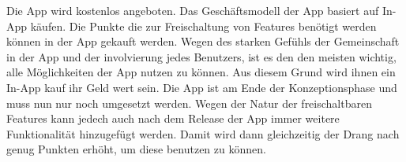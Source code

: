 Die App wird kostenlos angeboten. Das Geschäftsmodell der App basiert auf In-App käufen. Die Punkte die zur Freischaltung von Features benötigt werden können in der App gekauft werden. Wegen des starken Gefühls der Gemeinschaft in der App und der involvierung jedes Benutzers, ist es den den meisten wichtig, alle Möglichkeiten der App nutzen zu können. Aus diesem Grund wird ihnen ein In-App kauf ihr Geld wert sein.
Die App ist am Ende der Konzeptionsphase und muss nun nur noch umgesetzt werden. Wegen der Natur der freischaltbaren Features kann jedech auch nach dem Release der App immer weitere Funktionalität hinzugefügt werden. Damit wird dann gleichzeitig der Drang nach genug Punkten erhöht, um diese benutzen zu können.